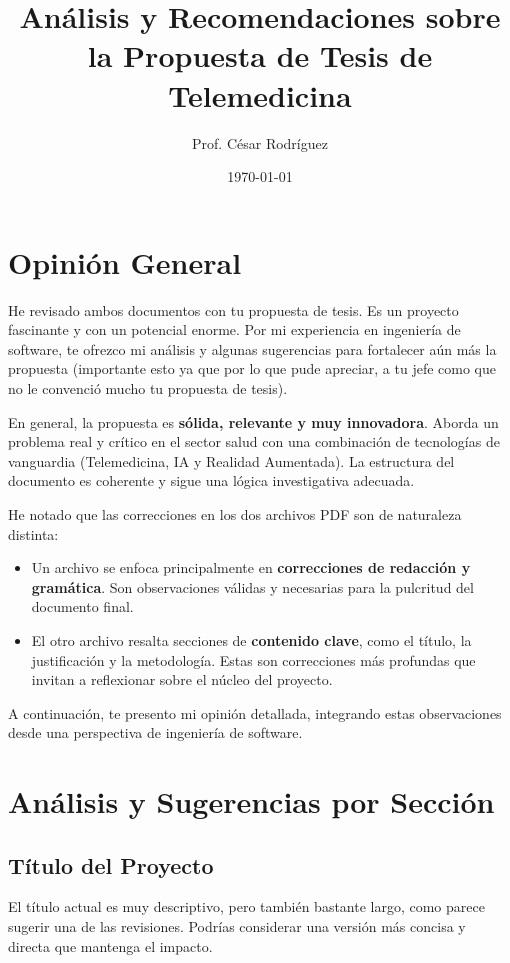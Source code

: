 \documentclass[12pt,a4paper]{article}
\title{Análisis y Recomendaciones sobre la Propuesta de Tesis de Telemedicina}
\author{Prof. César Rodríguez}
\date{\today}
\begin{document}
\maketitle
\tableofcontents
\newpage

\section{Opinión General}

He revisado ambos documentos con tu propuesta de tesis. Es un proyecto fascinante y con un potencial 
enorme. Por mi experiencia en ingeniería de software, te ofrezco mi análisis y algunas sugerencias 
para fortalecer aún más la propuesta (importante esto ya que por lo que pude apreciar, a tu jefe como 
que no le convenció mucho tu propuesta de tesis).

En general, la propuesta es \textbf{sólida, relevante y muy innovadora}. Aborda un problema real 
y crítico en el sector salud con una combinación de tecnologías de vanguardia (Telemedicina, IA y 
Realidad Aumentada). La estructura del documento es coherente y sigue una lógica investigativa 
adecuada.

He notado que las correcciones en los dos archivos PDF son de naturaleza distinta:
\begin{itemize}
    \item Un archivo se enfoca principalmente en \textbf{correcciones de redacción y gramática}. 
    Son observaciones válidas y necesarias para la pulcritud del documento final.
    \item El otro archivo resalta secciones de \textbf{contenido clave}, como el título, la justificación 
    y la metodología. Estas son correcciones más profundas que invitan a reflexionar sobre el núcleo 
    del proyecto.
\end{itemize}

A continuación, te presento mi opinión detallada, integrando estas observaciones desde una perspectiva 
de ingeniería de software.

\section{Análisis y Sugerencias por Sección}

\subsection{Título del Proyecto}
El título actual es muy descriptivo, pero también bastante largo, como parece sugerir una de las 
revisiones. Podrías considerar una versión más concisa y directa que mantenga el impacto.
\end{document}

